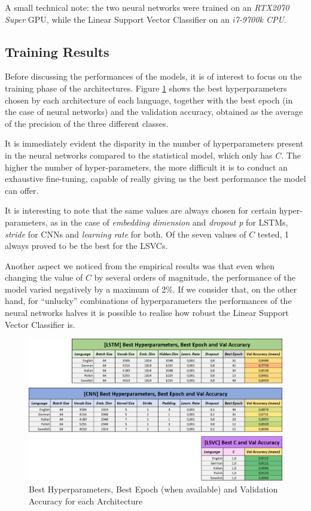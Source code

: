 \documentclass[letterpaper,11pt]{article}
\begin{document}
A small technical note: the two neural networks were trained on an \textit{RTX2070 Super} GPU, while the Linear Support Vector Classifier on an \textit{i7-9700k CPU}.

\subsection{Training Results}

Before discussing the performances of the models, it is of interest to focus on the training phase of the architectures. Figure \ref{fig:hyperparam_epoch_res} shows the best hyperparameters chosen by each architecture of each language, together with the best epoch (in the case of neural networks) and the validation accuracy, obtained as the average of the precision of the three different classes.

It is immediately evident the disparity in the number of hyperparameters present in the neural networks compared to the statistical model, which only has $C$. The higher the number of hyper-parameters, the more difficult it is to conduct an exhaustive fine-tuning, capable of really giving us the best performance the model can offer. 

It is interesting to note that the same values are always chosen for certain hyper-parameters, as in the case of \textit{embedding dimension} and \textit{dropout p} for LSTMs, \textit{stride} for CNNs and \textit{learning rate} for both. Of the seven values of $C$ tested, 1 always proved to be the best for the LSVCs. 

Another aspect we noticed from the empirical results was that even when changing the value of $C$ by several orders of magnitude, the performance of the model varied negatively by a maximum of 2\%. If we consider that, on the other hand, for ``unlucky'' combinations of hyperparameters the performances of the neural networks halves it is possible to realise how robust the Linear Support Vector Classifier is.

\begin{figure}[H]
  \centering
  \includegraphics[width=\textwidth]{hyperparam_res.png}
  \caption{Best Hyperparameters, Best Epoch (when available) and Validation Accuracy for each Architecture}
  \label{fig:hyperparam_epoch_res}
\end{figure}
\end{document}
